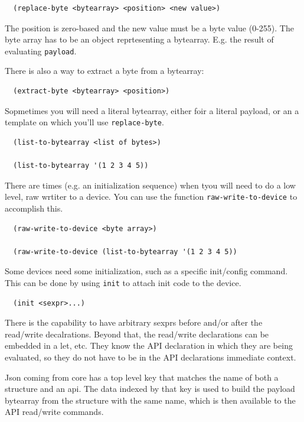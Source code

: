 \documentclass[12pt]{article}
\begin{document}
\begin{verbatim}
  (replace-byte <bytearray> <position> <new value>)
\end{verbatim}

The position is zero-based and the new value must be a byte value
(0-255). The byte array has to be an object reprtesenting a bytearray.
E.g. the result of evaluating \verb|payload|.

There is also a way to extract a byte from a bytearray:

\begin{verbatim}
  (extract-byte <bytearray> <position>)
\end{verbatim}

Sopmetimes you will need a literal bytearray, either foir a literal
payload, or an a template on which you'll use \verb|replace-byte|.

\begin{verbatim}
  (list-to-bytearray <list of bytes>)

  (list-to-bytearray '(1 2 3 4 5))
\end{verbatim}

There are times (e.g. an initialization sequence) when tyou will need
to do a low level, raw wrtiter to a device. You can use the function
\verb|raw-write-to-device| to accomplish this.

\begin{verbatim}
  (raw-write-to-device <byte array>)

  (raw-write-to-device (list-to-bytearray '(1 2 3 4 5))
\end{verbatim}

Some devices need some initialization, such as a specific init/config
command. This can be done by using \verb|init| to attach init code
to the device.

\begin{verbatim}
  (init <sexpr>...)
\end{verbatim}

There is the capability to have arbitrary sexprs before and/or after
the read/write decalrations. Beyond that, the read/write declarations
can be embedded in a let, etc. They know the API declaration in which
they are being evaluated, so they do not have to be in the API
declarations immediate context.

Json coming from core has a top level key that matches the name of
both a structure and an api. The data indexed by that key is used to
build the payload bytearray from the structure with the same name,
which is then available to the API read/write commands.
\end{document}
